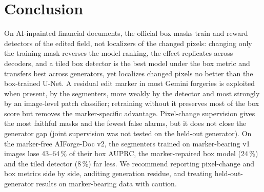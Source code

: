 \section{Conclusion}
\label{sec:conclusion}
On AI-inpainted financial documents, the official box masks train and reward detectors of the edited field, not localizers of the changed pixels: changing only the training mask reverses the model ranking, the effect replicates across decoders, and a tiled box detector is the best model under the box metric and transfers best across generators, yet localizes changed pixels no better than the box-trained U-Net. A residual edit marker in most Gemini forgeries is exploited when present, by the segmenters, more weakly by the detector and most strongly by an image-level patch classifier; retraining without it preserves most of the box score but removes the marker-specific advantage. Pixel-change supervision gives the most faithful masks and the fewest false alarms, but it does not close the generator gap (joint supervision was not tested on the held-out generator). On the marker-free AIForge-Doc v2, the segmenters trained on marker-bearing v1 images lose 43--64\,\% of their box AUPRC, the marker-repaired box model (24\,\%) and the tiled detector (8\,\%) far less. We recommend reporting pixel-change and box metrics side by side, auditing generation residue, and treating held-out-generator results on marker-bearing data with caution.
